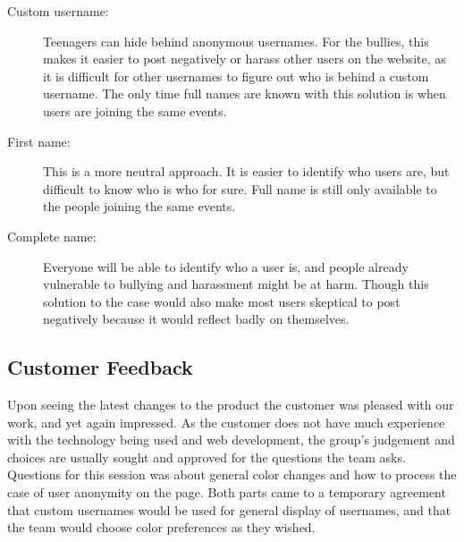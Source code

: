 \begin{description}
\item[Custom username: ] Teenagers can hide behind anonymous usernames. For the bullies, this makes it easier to post negatively or harass other users on the website, as it is difficult for other usernames to figure out who is behind a custom username. The only time full names are known with this solution is when users are joining the same events. 
\item[First name: ] This is a more neutral approach. It is easier to identify who users are, but difficult to know who is who for sure. Full name is still only available to the people joining the same events.
\item[Complete name: ] Everyone will be able to identify who a user is, and people already vulnerable to bullying and harassment might be at harm. Though this solution to the case would also make most users skeptical to post negatively because it would reflect badly on themselves. 
\end{description}


\subsection{Customer Feedback}
\label{subsec:S2RetrospectiveFeedback}
Upon seeing the latest changes to the product the customer was pleased with our work, and yet again impressed. As the customer does not have much experience with the technology being used and web development, the group's judgement and choices are usually sought and approved for the questions the team asks. Questions for this session was about general color changes and how to process the case of user anonymity on the page. Both parts came to a temporary agreement that custom usernames would be used for general display of usernames, and that the team would choose color preferences as they wished.
